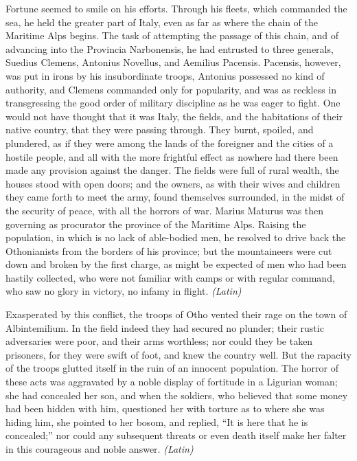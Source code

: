 Fortune seemed to smile on his efforts. Through his fleets, which commanded the sea, he held the greater part of Italy, even as far as where the chain of the Maritime Alps begins. The task of attempting the passage of this chain, and of advancing into the Provincia Narbonensis, he had entrusted to three generals, Suedius Clemens, Antonius Novellus, and Aemilius Pacensis. Pacensis, however, was put in irons by his insubordinate troops, Antonius possessed no kind of authority, and Clemens commanded only for popularity, and was as reckless in transgressing the good order of military discipline as he was eager to fight. One would not have thought that it was Italy, the fields, and the habitations of their native country, that they were passing through. They burnt, spoiled, and plundered, as if they were among the lands of the foreigner and the cities of a hostile people, and all with the more frightful effect as nowhere had there been made any provision against the danger. The fields were full of rural wealth, the houses stood with open doors; and the owners, as with their wives and children they came forth to meet the army, found themselves surrounded, in the midst of the security of peace, with all the horrors of war. Marius Maturus was then governing as procurator the province of the Maritime Alps. Raising the population, in which is no lack of able-bodied men, he resolved to drive back the Othonianists from the borders of his province; but the mountaineers were cut down and broken by the first charge, as might be expected of men who had been hastily collected, who were not familiar with camps or with regular command, who saw no glory in victory, no infamy in flight. \emph{(Latin)}


Exasperated by this conflict, the troops of Otho vented their rage on the town of Albintemilium. In the field indeed they had secured no plunder; their rustic adversaries were poor, and their arms worthless; nor could they be taken prisoners, for they were swift of foot, and knew the country well. But the rapacity of the troops glutted itself in the ruin of an innocent population. The horror of these acts was aggravated by a noble display of fortitude in a Ligurian woman; she had concealed her son, and when the soldiers, who believed that some money had been hidden with him, questioned her with torture as to where she was hiding him, she pointed to her bosom, and replied, ``It is here that he is concealed;'' nor could any subsequent threats or even death itself make her falter in this courageous and noble answer. \emph{(Latin)}

